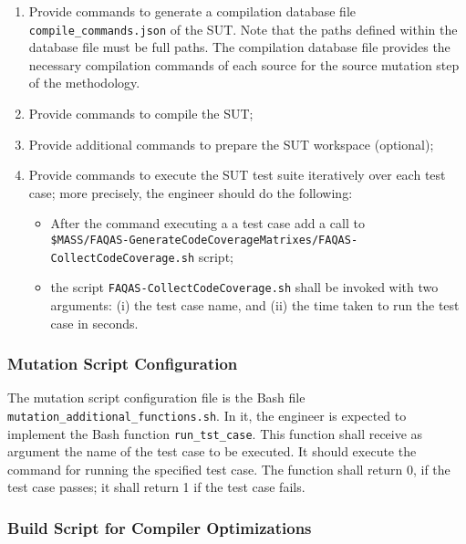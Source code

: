\begin{enumerate}
	\item Provide commands to generate a compilation database file \texttt{compile\_commands.json} of the SUT. Note that the paths defined within the database file must be full paths. The compilation database file provides the necessary compilation commands of each source for the source mutation step of the methodology.
	\item Provide commands to compile the SUT;
	\item Provide additional commands to prepare the SUT workspace (optional);
	\item Provide commands to execute the SUT test suite iteratively over each test case; more precisely, the engineer should do the following:
	\begin{itemize}
		\item After the command executing a a test case add a call to \\\texttt{\$MASS/FAQAS-GenerateCodeCoverageMatrixes/FAQAS-CollectCodeCoverage.sh} script;
		\item the script \texttt{FAQAS-CollectCodeCoverage.sh} shall be invoked with two arguments: (i) the test case name, and (ii) the time taken to run the test case in seconds.
	\end{itemize}
\end{enumerate}

\subsubsection{Mutation Script Configuration}

The mutation script configuration file is the Bash file \texttt{mutation\_additional\_functions.sh}. In it, the engineer is expected to implement the Bash function \texttt{run\_tst\_case}.
This function shall receive as argument the name of the test case to be executed. It should execute the command for running the specified test case.
The function shall return 0, if the test case passes; it shall return 1 if the test case fails.


\subsubsection{Build Script for Compiler Optimizations}

